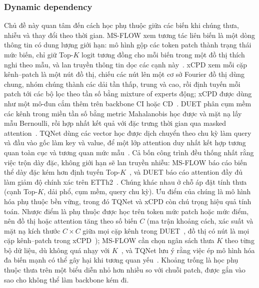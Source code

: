 \documentclass[conference]{IEEEtran}
\begin{document}
\subsubsection{Dynamic dependency}
Chủ đề này quan tâm đến cách học phụ thuộc giữa các biến khi chúng thưa, nhiễu và thay đổi theo thời gian. MS-FLOW xem
tương tác liên biến là một dòng thông tin có dung lượng giới hạn: mô hình gộp các token patch thành trạng thái mức biến,
chỉ giữ Top-$K$ logit tương đồng cho mỗi biến trong một đồ thị thích nghi theo mẫu, và lan truyền thông tin dọc các cạnh
này~\cite{Zhang2026MSFLOW}. xCPD xem mỗi cặp kênh--patch là một nút đồ thị, chiếu các nút lên một cơ sở Fourier đồ thị
dùng chung, nhóm chúng thành các dải tần thấp, trung và cao, rồi định tuyến mỗi patch tới các bộ lọc theo tần số bằng
mixture of experts động; xCPD được dùng như một mô-đun cắm thêm trên backbone CI hoặc CD~\cite{Li2026xCPD}. DUET phân cụm
mềm các kênh trong miền tần số bằng metric Mahalanobis học được và mặt nạ lấy mẫu Bernoulli, rồi hợp nhất kết quả với đặc
trưng thời gian qua masked attention~\cite{Qiu2025DUET}. TQNet dùng các vector học được dịch chuyển theo chu kỳ làm query
và đầu vào gốc làm key và value, để một lớp attention duy nhất kết hợp tương quan toàn cục và tương quan mức
mẫu~\cite{Lin2025TQNet}. Cả bốn công trình đều thống nhất rằng việc trộn dày đặc, không giới hạn sẽ lan truyền nhiễu:
MS-FLOW báo cáo biến thể dày đặc kém hơn định tuyến Top-$K$~\cite{Zhang2026MSFLOW}, và DUET báo cáo attention đầy đủ làm
giảm độ chính xác trên ETTh2~\cite{Qiu2025DUET}. Chúng khác nhau ở chỗ áp đặt tính thưa (cạnh Top-$K$, dải phổ, cụm mềm,
query chu kỳ). Ưu điểm của chúng là mô hình hóa phụ thuộc bền vững, trong đó TQNet và xCPD còn chú trọng hiệu quả tính
toán. Nhược điểm là phụ thuộc được học trên token mức patch hoặc mức điểm, nên đồ thị hoặc attention tăng theo số biến $C$
(ma trận khoảng cách, xác suất và mặt nạ kích thước $C\times C$ giữa mọi cặp kênh trong DUET~\cite{Qiu2025DUET}, đồ thị
có nút là mọi cặp kênh--patch trong
xCPD~\cite{Li2026xCPD}); MS-FLOW cần chọn ngân sách thưa $K$ theo từng bộ dữ liệu, dù không quá nhạy với
$K$~\cite{Zhang2026MSFLOW}, và TQNet lưu ý
rằng việc ép mô hình hóa đa biến mạnh có thể gây hại khi tương quan yếu~\cite{Lin2025TQNet}. Khoảng trống là học phụ thuộc
thưa trên một biểu diễn nhỏ hơn nhiều so với chuỗi patch, được gắn vào sao cho không thể làm backbone kém đi.
\end{document}
